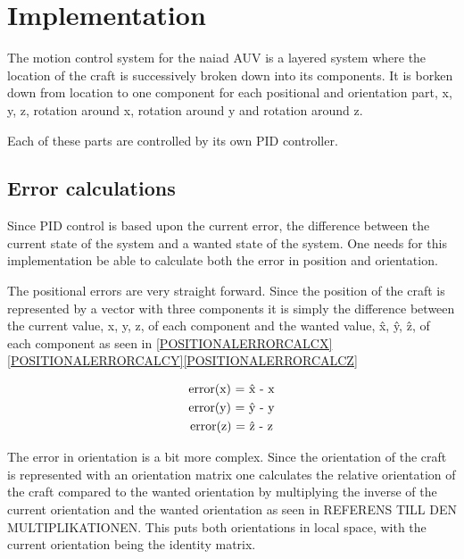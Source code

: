 \section{Implementation}\label{sec:implementation}

The motion control system for the naiad AUV is a layered system where the location of the craft is successively broken down into its components. It is borken down from location to one component for each positional and orientation part, x, y, z, rotation around x, rotation around y and rotation around z. 

Each of these parts are controlled by its own PID controller.

\subsection{Error calculations}
Since PID control is based upon the current error, the difference between the current state of the system and a wanted state of the system. One needs for this implementation be able to calculate both the error in position and orientation.

The positional errors are very straight forward. Since the position of the craft is represented by a vector with three components it is simply the difference between the current value, x, y, z, of each component and the wanted value, \^x, \^y, \^z, of each component as seen in \eqref{POSITIONALERRORCALCX}\eqref{POSITIONALERRORCALCY}\eqref{POSITIONALERRORCALCZ}

\begin{center}
	\begin{gather}
		\label{POSITIONALERRORCALCX} $error(x) = \^x - x$ \\
		\label{POSITIONALERRORCALCY} $error(y) = \^y - y$ \\
		\label{POSITIONALERRORCALCZ} $error(z) = \^z - z$
	\end{gather}
\end{center}

The error in orientation is a bit more complex. Since the orientation of the craft is represented with an orientation matrix one calculates the relative orientation of the craft compared to the wanted orientation by multiplying the inverse of the current orientation and the wanted orientation as seen in REFERENS TILL DEN MULTIPLIKATIONEN. This puts both orientations in local space, with the current orientation being the identity matrix.

